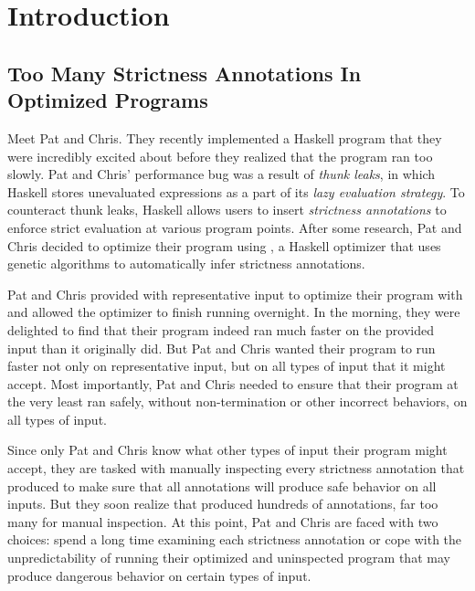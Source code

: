 
\chapter{Introduction} %

\label{Chapter1} %


\newcommand{\keyword}[1]{\textbf{#1}}
\newcommand{\tabhead}[1]{\textbf{#1}}
\newcommand{\code}[1]{\texttt{#1}}
\newcommand{\file}[1]{\texttt{\bfseries#1}}
\newcommand{\option}[1]{\texttt{\itshape#1}}


\section{Too Many Strictness Annotations In Optimized Programs}

Meet Pat and Chris. They recently implemented a Haskell program
that they were incredibly excited about before they realized that the program
ran too slowly. Pat and Chris' performance bug was a result of \textit{thunk leaks}, in which 
Haskell stores unevaluated expressions as a part of its \textit{lazy evaluation
strategy}. To counteract thunk leaks, Haskell allows users to insert \textit{strictness
annotations} to enforce strict evaluation at various program points. After some research,
Pat and Chris decided to optimize their program using \Ao{}, a Haskell optimizer
that uses genetic algorithms to automatically infer strictness annotations.

Pat and Chris provided \Ao{} with representative input to optimize their program with
and allowed the optimizer to finish running overnight. In the morning, they were
delighted to find that their program indeed ran much faster on the provided input
than it originally did. But Pat and Chris wanted their program to run faster not
only on representative input, but on all types of input that it might accept.
Most importantly, Pat and Chris needed to ensure that their program at the very least
ran safely, without non-termination or other incorrect behaviors, on all types of input.

Since only Pat and Chris know what other types of input their program might accept,
they are tasked with manually inspecting every strictness annotation that \Ao{} produced
to make sure that all annotations will produce safe behavior on all inputs. But they
soon realize that \Ao{} produced hundreds of annotations, far too many for manual inspection.
At this point, Pat and Chris are faced with two choices: spend a long time examining each
strictness annotation or cope with the unpredictability of running their optimized and
uninspected program that may produce dangerous behavior on certain types of input.

